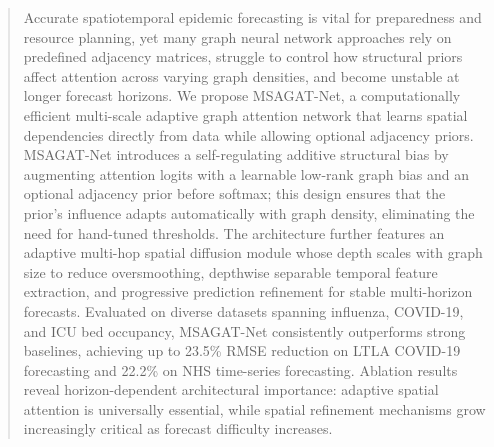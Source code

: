 \documentclass[a4paper,fleqn]{cas-dc}
\begin{document}
\begin{abstract}
Accurate spatiotemporal epidemic forecasting is vital for preparedness and resource planning, yet many graph neural network approaches rely on predefined adjacency matrices, struggle to control how structural priors affect attention across varying graph densities, and become unstable at longer forecast horizons. We propose MSAGAT-Net, a computationally efficient multi-scale adaptive graph attention network that learns spatial dependencies directly from data while allowing optional adjacency priors. MSAGAT-Net introduces a self-regulating additive structural bias by augmenting attention logits with a learnable low-rank graph bias and an optional adjacency prior before softmax; this design ensures that the prior’s influence adapts automatically with graph density, eliminating the need for hand-tuned thresholds. The architecture further features an adaptive multi-hop spatial diffusion module whose depth scales with graph size to reduce oversmoothing, depthwise separable temporal feature extraction, and progressive prediction refinement for stable multi-horizon forecasts. Evaluated on diverse datasets spanning influenza, COVID-19, and ICU bed occupancy, MSAGAT-Net consistently outperforms strong baselines, achieving up to 23.5\% RMSE reduction on LTLA COVID-19 forecasting and 22.2\% on NHS time-series forecasting. Ablation results reveal horizon-dependent architectural importance: adaptive spatial attention is universally essential, while spatial refinement mechanisms grow increasingly critical as forecast difficulty increases.
\end{abstract}


\end{document}
